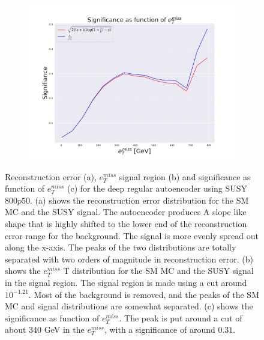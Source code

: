 \begin{figure}[H]
    \hfill  
    \begin{subfigure}{.40\textwidth}
        \includegraphics[width=\textwidth]{Figures/AE_testing/small/2lep/significance_etmiss_800p0p050_-1.2087791708604207.pdf}
        \caption{}
        \label{fig:AE_2lep_small_signi_800_2}
    \end{subfigure}
    \hfill      
    \caption[2lep shallow network | $800p50$ | AE | 2]{Reconstruction error (a), $e_T^{miss}$ signal region (b) and significance as function of 
    $e_T^{miss}$ (c) for the deep regular autoencoder using SUSY $800p50$. 
    (a) shows the reconstruction error distribution for the SM MC and the SUSY signal. 
    The autoencoder produces A slope like shape that is highly shifted to the lower end of the reconstruction error range
for the background. The signal is more evenly spread out along the x-axis. The peaks of the two distributions are totally separated
with two orders of magnitude in reconstruction error. (b) shows the $e_T^{miss}$
T distribution for the SM MC and the SUSY signal in the signal region. The signal region is made using a cut around
$10^{-1.21}$. Most of the background is removed, and the peaks of the SM MC and signal distributions are
somewhat separated. (c) shows the significance as function of $e_T^{miss}$. The peak is put 
around a cut of about 340 GeV in the $e_T^{miss}$, with a significance of around $0.31$.}
    \label{fig:AE_2lep_small_rec_sig_signi_800_2}
\end{figure}
























